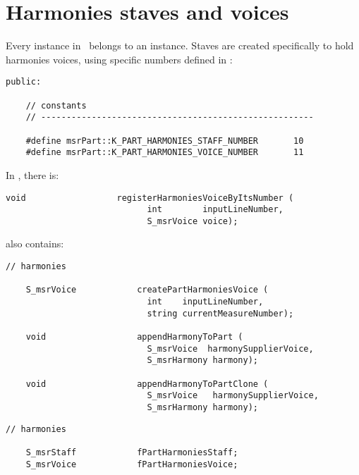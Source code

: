 \section{Harmonies staves and voices}

Every  instance in \mf\ belongs to an  instance. Staves are created specifically to hold harmonies voices, using specific numbers defined in :
\begin{lstlisting}[language=CPlusPlus]
  public:

    // constants
    // ------------------------------------------------------

    #define msrPart::K_PART_HARMONIES_STAFF_NUMBER       10
    #define msrPart::K_PART_HARMONIES_VOICE_NUMBER       11
\end{lstlisting}

In , there is:
\begin{lstlisting}[language=CPlusPlus]
    void                  registerHarmoniesVoiceByItsNumber (
                            int        inputLineNumber,
                            S_msrVoice voice);
\end{lstlisting}

 also contains:
\begin{lstlisting}[language=CPlusPlus]
   // harmonies

    S_msrVoice            createPartHarmoniesVoice (
                            int    inputLineNumber,
                            string currentMeasureNumber);

    void                  appendHarmonyToPart (
                            S_msrVoice  harmonySupplierVoice,
                            S_msrHarmony harmony);

    void                  appendHarmonyToPartClone (
                            S_msrVoice   harmonySupplierVoice,
                            S_msrHarmony harmony);
\end{lstlisting}

\begin{lstlisting}[language=CPlusPlus]
    // harmonies

    S_msrStaff            fPartHarmoniesStaff;
    S_msrVoice            fPartHarmoniesVoice;
\end{lstlisting}


